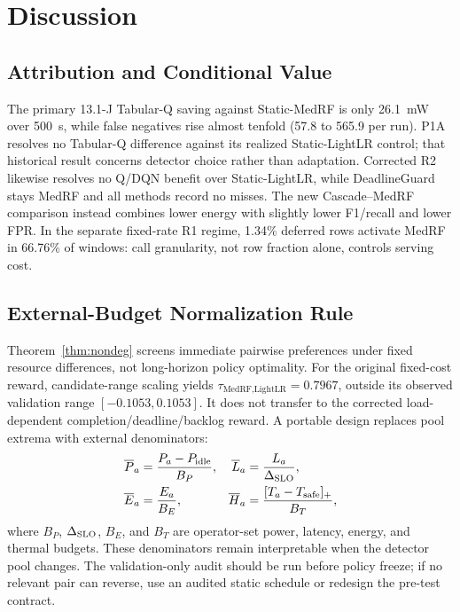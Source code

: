 \section{Discussion}
\label{sec:discuss}
\subsection{Attribution and Conditional Value}
The primary 13.1-J Tabular-Q saving against Static-MedRF is only 26.1~mW over 500~s, while false negatives rise almost tenfold (57.8 to 565.9 per run). P1A resolves no Tabular-Q difference against its realized Static-LightLR control; that historical result concerns detector choice rather than adaptation. Corrected R2 likewise resolves no Q/DQN benefit over Static-LightLR, while DeadlineGuard stays MedRF and all methods record no misses. The new Cascade--MedRF comparison instead combines lower energy with slightly lower F1/recall and lower FPR. In the separate fixed-rate R1 regime, 1.34\% deferred rows activate MedRF in 66.76\% of windows: call granularity, not row fraction alone, controls serving cost.

\subsection{External-Budget Normalization Rule}
Theorem~\ref{thm:nondeg} screens immediate pairwise preferences under fixed resource differences, not long-horizon policy optimality. For the original fixed-cost reward, candidate-range scaling yields $\tau_{\text{MedRF,LightLR}}=0.7967$, outside its observed validation range $[-0.1053,0.1053]$. It does not transfer to the corrected load-dependent completion/deadline/backlog reward. A portable design replaces pool extrema with external denominators:
\begin{align}
\overline P_a&=\frac{P_a-P_{\rm idle}}{B_P}, &
\overline L_a&=\frac{L_a}{\Delta_{\rm SLO}},\\
\overline E_a&=\frac{E_a}{B_E}, &
\overline H_a&=\frac{[T_a-T_{\rm safe}]_+}{B_T},
\end{align}
where $B_P$, $\Delta_{\rm SLO}$, $B_E$, and $B_T$ are operator-set power, latency, energy, and thermal budgets. These denominators remain interpretable when the detector pool changes. The validation-only audit should be run before policy freeze; if no relevant pair can reverse, use an audited static schedule or redesign the pre-test contract.


